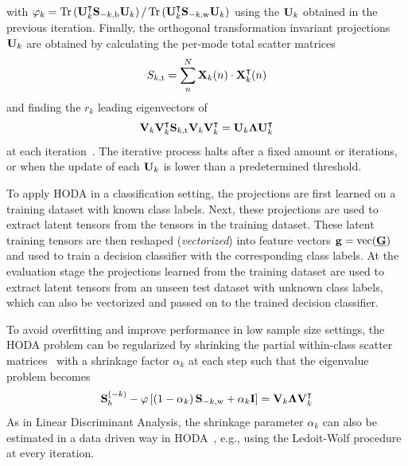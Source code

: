 \documentclass[twocolumn]{article}
\begin{document}
with $\varphi_k=\operatorname{Tr}\left(\mathbf{U}_k^\intercal\mathbf{S}_{-k,\text{b}}\mathbf{U}_k\right)/\operatorname{Tr}\left(\mathbf{U}_k^\intercal\mathbf{S}_{-k,\text{w}}\mathbf{U}_k\right)$
using the $\mathbf{U}_k$ obtained in the previous iteration.
Finally, the orthogonal transformation invariant projections $\mathbf{U}_k$
are obtained by calculating the
per-mode total scatter matrices
\begin{equation}
	S_{k,\text{t}} = \sum_n^N\mathbf{X}_k(n)\cdot\mathbf{X}_k^\intercal(n)
\end{equation}
and finding the $r_k$ leading eigenvectors of
\begin{equation}
	\mathbf{V}_k\mathbf{V}_k^\intercal\mathbf{S}_{k,\text{t}}\mathbf{V}_k\mathbf{V}_k^\intercal
	= \mathbf{U}_k\mathbf{\Lambda}\mathbf{U}_k^\intercal
\end{equation}
at each iteration~\cite{Wang2007}.
The iterative process halts after a fixed amount or iterations, or when the
update of each $\mathbf{U}_k$ is lower than a predetermined threshold.

To apply \textsc{HODA} in a classification setting, the projections
are first learned on a training dataset  with known class labels.
Next, these projections are used to extract latent tensors from the
tensors in the training dataset.
These latent training tensors are then reshaped (\emph{vectorized}) into feature vectors
$\mathbf{g} =  \operatorname{vec}(\underline{\mathbf{G}})$ and used to train a decision classifier with the corresponding class labels.
At the evaluation stage the projections learned from the training dataset are
used to extract latent tensors from an unseen test dataset with unknown class
labels, which can also be vectorized and passed on to the trained decision
classifier.

To avoid overfitting and improve performance in low sample size settings, the
\textsc{HODA} problem can be regularized by shrinking the partial
within-class scatter matrices~\cite{Phan2010} with a shrinkage factor
$\alpha_k$ at each step such that the eigenvalue problem becomes
\begin{equation}
	\mathbf{S}_b^{(-k)} -
	\varphi\left[\left(1-\alpha_k\right)\mathbf{S}_{-k,\text{w}}+\alpha_k\mathbf{I}\right] =
	\mathbf{V}_k\mathbf{\Lambda}\mathbf{V}_k^\intercal
\end{equation}
As in Linear Discriminant Analysis, the shrinkage parameter $\alpha_k$ can
also be estimated in a data driven way in \textsc{HODA}~\cite{Jorajuria2022},
e.g., using the Ledoit-Wolf procedure~\cite{Ledoit2003} at every iteration.
\end{document}
